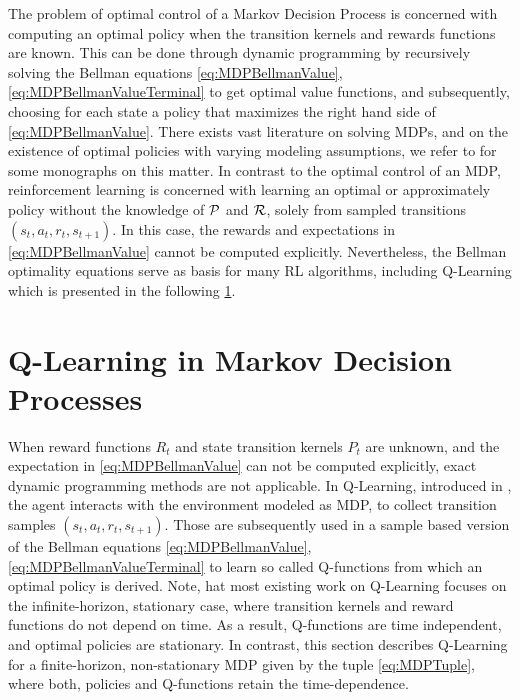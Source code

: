 \documentclass[
    a4paper,
    11pt,
    bibliography=totoc,
    listof=totoc,      
    headinclude=true,
    cleardoublepage=empty,
]{scrbook}
\theoremstyle{plain}
\theoremstyle{definition}
\theoremstyle{remark}
\newcommand{\KernelP}{{\cal P}}
\newcommand{\KernelR}{{\cal R}}
\begin{document}
The problem of optimal control of a Markov Decision Process is concerned with 
computing an optimal policy when the transition kernels and rewards functions
are known. This can be done through dynamic programming by recursively solving 
the Bellman equations \eqref{eq:MDPBellmanValue},
\eqref{eq:MDPBellmanValueTerminal} to get optimal value functions, and 
subsequently, choosing for each state a policy that maximizes the right hand 
side of \eqref{eq:MDPBellmanValue}. There exists vast literature on solving 
MDPs, and on the existence of optimal policies with varying modeling 
assumptions, we refer to \cite{puterman2005_mdpdsdp, hinderer2016_do, 
feinberg2002_hmdp} for some monographs on this matter. 
%
In contrast to the optimal control of an MDP, reinforcement learning is
concerned with learning an optimal or approximately policy without the 
knowledge of $\KernelP$ and $\KernelR$, solely from sampled transitions 
$(s_t, a_t, r_t, s_{t+1})$. In this case, the rewards and expectations in 
\eqref{eq:MDPBellmanValue} cannot be computed explicitly. Nevertheless, the 
Bellman optimality equations serve as basis for many RL algorithms, including 
Q-Learning which is presented in the following 
\cref{chapter:RLAndMDP:section:QLearningInMDP}.

\section{Q-Learning in Markov Decision Processes} 
\label{chapter:RLAndMDP:section:QLearningInMDP}

When reward functions $R_t$ and state transition kernels $P_t$ are unknown, 
and the expectation in \eqref{eq:MDPBellmanValue} can not be computed 
explicitly, exact dynamic programming methods are not applicable. In 
Q-Learning, introduced in \cite{watkins1992_q}, the agent interacts with the 
environment modeled as MDP, to collect transition samples $(s_t, a_t, r_t, 
s_{t+1})$. Those are subsequently used in a sample based version of the 
Bellman equations \eqref{eq:MDPBellmanValue}, 
\eqref{eq:MDPBellmanValueTerminal} to learn so called Q-functions from which 
an optimal policy is derived. Note, hat most existing work on Q-Learning 
focuses on the infinite-horizon, stationary case, where transition kernels and 
reward functions do not depend on time. As a result, Q-functions are time 
independent, and optimal policies are stationary. In contrast, this section 
describes Q-Learning for a finite-horizon, non-stationary MDP given by the 
tuple \cref{eq:MDPTuple}, where both, policies and Q-functions retain the 
time-dependence.
\end{document}
